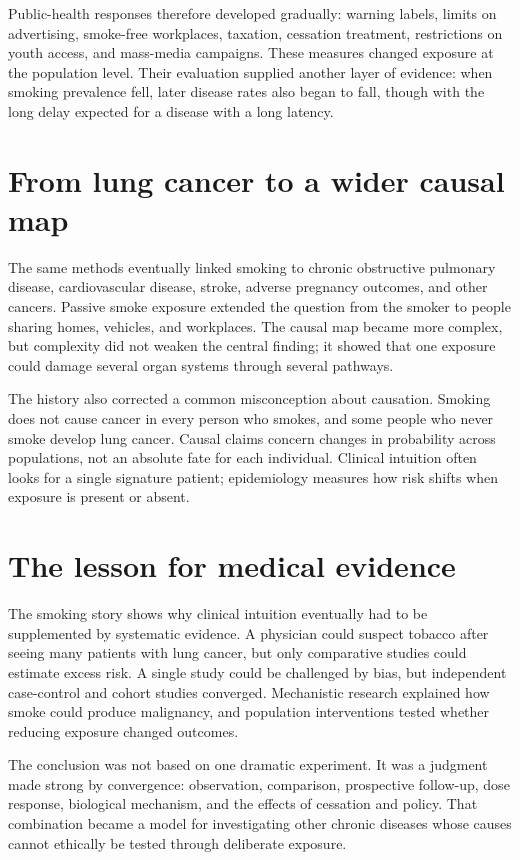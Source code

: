 \documentclass[12pt,oneside]{book}
\begin{document}
Public-health responses therefore developed gradually: warning labels, limits on
advertising, smoke-free workplaces, taxation, cessation treatment, restrictions
on youth access, and mass-media campaigns. These measures changed exposure at
the population level. Their evaluation supplied another layer of evidence:
when smoking prevalence fell, later disease rates also began to fall, though
with the long delay expected for a disease with a long latency.

\section{From lung cancer to a wider causal map}
The same methods eventually linked smoking to chronic obstructive pulmonary
disease, cardiovascular disease, stroke, adverse pregnancy outcomes, and other
cancers. Passive smoke exposure extended the question from the smoker to people
sharing homes, vehicles, and workplaces. The causal map became more complex,
but complexity did not weaken the central finding; it showed that one exposure
could damage several organ systems through several pathways.

The history also corrected a common misconception about causation. Smoking does
not cause cancer in every person who smokes, and some people who never smoke
develop lung cancer. Causal claims concern changes in probability across
populations, not an absolute fate for each individual. Clinical intuition often
looks for a single signature patient; epidemiology measures how risk shifts
when exposure is present or absent.

\section{The lesson for medical evidence}
The smoking story shows why clinical intuition eventually had to be supplemented
by systematic evidence. A physician could suspect tobacco after seeing many
patients with lung cancer, but only comparative studies could estimate excess
risk. A single study could be challenged by bias, but independent case-control
and cohort studies converged. Mechanistic research explained how smoke could
produce malignancy, and population interventions tested whether reducing exposure
changed outcomes.

The conclusion was not based on one dramatic experiment. It was a judgment made
strong by convergence: observation, comparison, prospective follow-up, dose
response, biological mechanism, and the effects of cessation and policy. That
combination became a model for investigating other chronic diseases whose causes
cannot ethically be tested through deliberate exposure.
\end{document}
